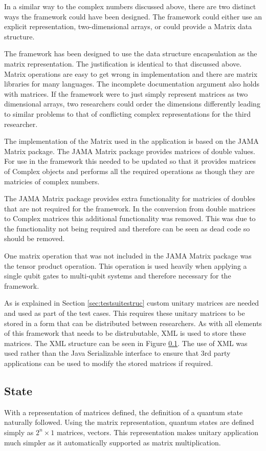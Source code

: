 In a similar way to the complex numbers discussed above, there are two distinct ways the framework could have been designed.
The framework could either use an explicit representation, two-dimensional arrays, or could provide a Matrix data structure.

The framework has been designed to use the data structure encapsulation as the matrix representation.
The justification is identical to that discussed above.
Matrix operations are easy to get wrong in implementation and there are matrix libraries for many languages.
The incomplete documentation argument also holds with matrices.
If the framework were to just simply represent matrices as two dimensional arrays, two researchers could order the dimensions differently leading to similar problems to that of conflicting complex representations for the third researcher.

The implementation of the Matrix used in the application is based on the JAMA Matrix package\cite{javamatrix}.
The JAMA Matrix package provides matrices of double values.
For use in the framework this needed to be updated so that it provides matrices of Complex objects and performs all the required operations as though they are matricies of complex numbers.

The JAMA Matrix package provides extra functionality for matricies of doubles that are not required for the framework.
In the conversion from double matrices to Complex matrices this additional functionality was removed.
This was due to the functionality not being required and therefore can be seen as dead code so should be removed.

One matrix operation that was not included in the JAMA Matrix package was the tensor product operation.
This operation is used heavily when applying a single qubit gates to multi-qubit systems and therefore necessary for the framework.

As is explained in Section \ref{sec:testsuitestruc} custom unitary matrices are needed and used as part of the test cases.
This requires these unitary matrices to be stored in a form that can be distributed between researchers.
As with all elements of this framework that needs to be distrubutable, XML is used to store these matrices.
The XML structure can be seen in Figure \ref{}.
The use of XML was used rather than the Java Serializable interface to ensure that 3rd party applications can be used to modify the stored matrices if required.

\subsection{State}
With a representation of matrices defined, the definition of a quantum state naturally followed.
Using the matrix representation, quantum states are defined simply as $2^n\times1$ matrices, vectors.
This representation makes unitary application much simpler as it automatically supported as matrix multiplication.

